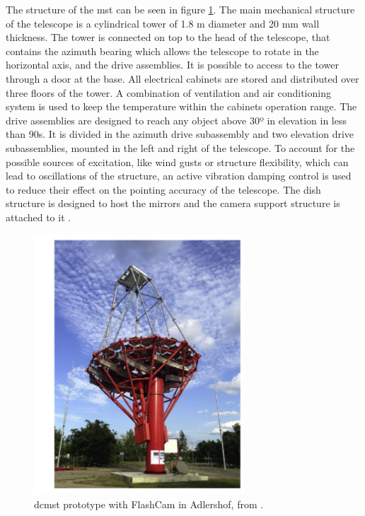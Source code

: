 \documentclass[main.tex]{subfiles}
\begin{document}
The structure of the \gls{mst} can be seen in figure \ref{fig:2MST}.
The main mechanical structure of the telescope is a cylindrical tower of 1.8 m diameter and 20 mm wall thickness. The tower is connected on top to the head of the telescope, that contains the azimuth bearing which allows the telescope to rotate in the horizontal axis, and the drive assemblies. It is possible to access to the tower through a door at the base. All electrical cabinets are stored and distributed over three floors of the tower. A combination of ventilation and air conditioning system is used to keep the temperature within the cabinets operation range.
The drive assemblies are designed to reach any object above 30º in elevation in less than 90s. It is divided in the azimuth drive subassembly and two elevation drive subassemblies, mounted in the left and right of the telescope.
To account for the possible sources of excitation, like wind gusts or structure flexibility, which can lead to oscillations of the structure, an active vibration damping control is used to reduce their effect on the pointing accuracy of the telescope.
The dish structure is designed to host the mirrors and the camera support structure is attached to it \cite{2015DCMSTstatus}.

\begin{figure}
\centering
 \includegraphics[width=0.7\textwidth]{Pictures/MST.pdf}
  \caption{\gls{dcmst} prototype with FlashCam in Adlershof, from \cite{2018MSTandLSTstatus}.}
    \label{fig:2MST}
\end{figure}
\end{document}
